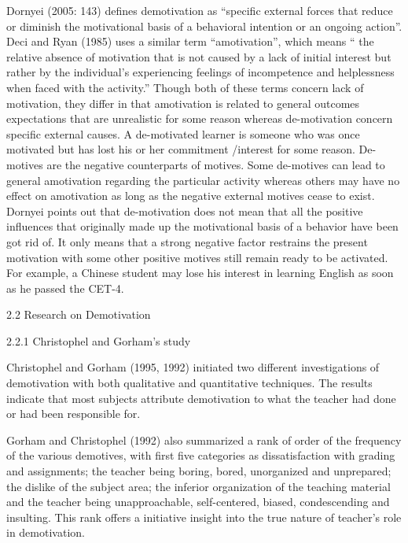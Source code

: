 
Dornyei (2005: 143) defines demotivation as “specific external forces that reduce or diminish the motivational basis of a behavioral intention or an ongoing action”. Deci and Ryan (1985) uses a similar term “amotivation”, which means “ the relative absence of motivation that is not caused by a lack of initial interest but rather by the individual’s experiencing feelings of incompetence and helplessness when faced with the activity.” Though both of these terms concern lack of motivation, they differ in that amotivation is related to general outcomes expectations that are unrealistic for some reason whereas de-motivation concern specific external causes. A de-motivated learner is someone who was once motivated but has lost his or her commitment /interest for some reason. De-motives are the negative counterparts of motives. Some de-motives can lead to general amotivation regarding the particular activity whereas others may have no effect on amotivation as long as the negative external motives cease to exist. Dornyei points out that de-motivation does not mean that all the positive influences that originally made up the motivational basis of a behavior have been got rid of. It only means that a strong negative factor restrains the present motivation with some other positive motives still remain ready to be activated. For example, a Chinese student may lose his interest in learning English as soon as he passed the CET-4.

2.2 Research on Demotivation

2.2.1 Christophel and Gorham’s study

Christophel and Gorham (1995, 1992) initiated two different investigations of demotivation with both qualitative and quantitative techniques.
The results indicate that most subjects attribute demotivation to what the teacher had done or had been responsible for.

Gorham and Christophel (1992) also summarized a rank of order of the frequency of the various demotives, with first five categories as dissatisfaction with grading and assignments; the teacher being boring, bored, unorganized and unprepared; the dislike of the subject area; the inferior organization of the teaching material and the teacher being unapproachable, self-centered, biased, condescending and insulting.
This rank offers a initiative insight into the true nature of teacher’s role in demotivation.

